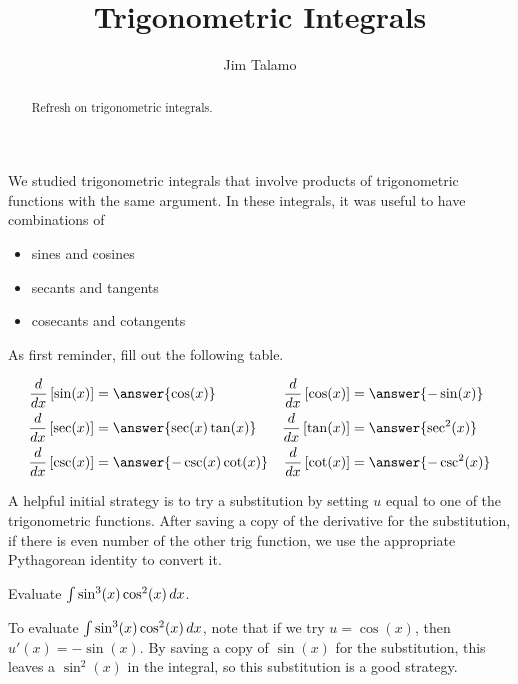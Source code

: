 \documentclass{ximera}
\title[Refresh:]{Trigonometric Integrals}
\author{Jim Talamo}
\begin{document}
\begin{abstract}
 Refresh on trigonometric integrals.
\end{abstract}
\maketitle


\begin{exercise}

We studied trigonometric integrals that involve products of trigonometric functions with the same argument.  In these integrals, it was useful to have combinations of 

\begin{itemize}
\item sines and cosines
\item secants and tangents
\item cosecants and cotangents
\end{itemize}

As first reminder, fill out the following table.

\begin{align*}
\frac{d}{dx}\left[\sin(x)\right] & = \answer{\cos(x)} & \frac{d}{dx}\left[\cos(x)\right] & = \answer{-\sin(x)} \\
\frac{d}{dx}\left[\sec(x)\right] & = \answer{\sec(x)\tan(x)} & \frac{d}{dx}\left[\tan(x)\right] & = \answer{\sec^2(x)} \\
\frac{d}{dx}\left[\csc(x)\right] & = \answer{-\csc(x)\cot(x)} & \frac{d}{dx}\left[\cot(x)\right] & = \answer{-\csc^2(x)} 
\end{align*}

\begin{exercise}
A helpful initial strategy is to try a substitution by setting $u$ equal to one of the trigonometric functions.  After saving a copy of the derivative for the substitution, if there is even number of the other trig function, we use the appropriate Pythagorean identity to convert it.

\begin{example}
Evaluate  $\int \sin^3(x) \cos^2(x) \mathop{}\!d x$.

\begin{explanation}

To evaluate $\int \sin^3(x) \cos^2(x) \mathop{}\!d x$, note that if we try $u=\cos(x)$, then $u'(x) = -\sin(x)$.  By saving a copy of $\sin(x)$ for the substitution, this leaves a $\sin^2(x)$ in the integral, so this substitution is a good strategy.


\end{explanation}
\end{example}
\end{exercise}
\end{exercise}
\end{document}
